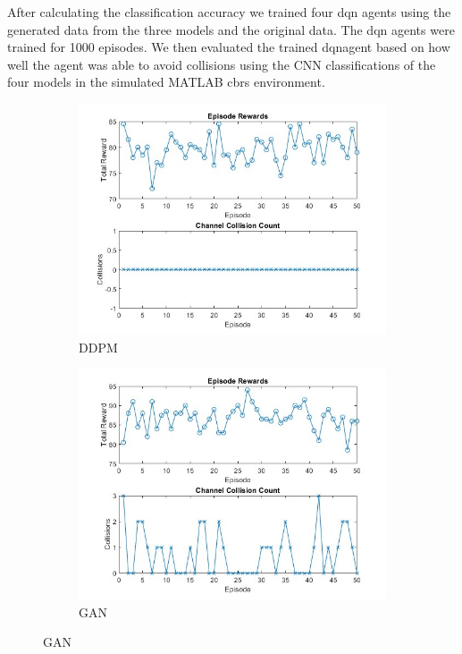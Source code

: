     After calculating the classification accuracy we trained four \gls{dqn} agents using the generated data from the three models and the original data. The \gls{dqn} agents were trained for 1000 episodes. We then evaluated the trained \gls{dqn}agent based on how well the agent was able to avoid collisions using the CNN classifications of the four models in the simulated MATLAB \gls{cbrs} environment.

    
\begin{figure}[htbp]
    \centering
    \begin{subfigure}[b]{0.45\textwidth}
        \centering
        \includegraphics[width=\linewidth]{figures/collision_count_ddpm.jpg}
        \caption{DDPM}
    \end{subfigure}
    \hfill
    \begin{subfigure}[b]{0.45\textwidth}
        \centering
        \includegraphics[width=\linewidth]{figures/collision_count_gan.jpg}
        \caption{GAN}
    \end{subfigure}


\end{figure}
